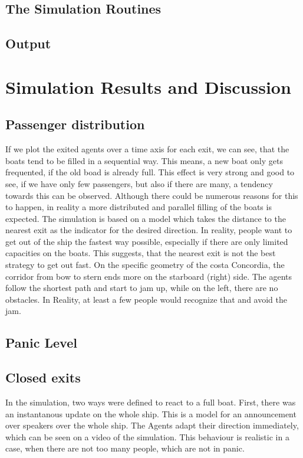 \documentclass[11pt]{article}
\begin{document}
\subsection{The Simulation Routines} %
\label{sub:The simulation Routines}


\subsection{Output} %
\label{sub:Output}

\section{Simulation Results and Discussion}

\subsection{Passenger distribution} %
If we plot the exited agents over a time axis for each exit, we can see, that the boats tend to be filled in a sequential way.
This means, a new boat only gets frequented, if the old boad is already full. This effect is very strong and good to see, if we have only few passengers, but also if there are many, a tendency towards this can be observed.
Although there could be numerous reasons for this to happen, in reality a more distributed and parallel filling of the boats is expected. The simulation is based on a model which takes the distance to the nearest exit as the indicator for the desired direction.
In reality, people want to get out of the ship the fastest way possible, especially if there are only limited capacities on the boats.
This suggests, that the nearest exit is not the best strategy to get out fast.
On the specific geometry of the costa Concordia, the corridor from bow to stern ends more on the starboard (right) side. 
The agents follow the shortest path and start to jam up, while on the left, there are no obstacles.
In Reality, at least a few people would recognize that and avoid the jam.

\subsection{Panic Level} %

\subsection{Closed exits} %
\label{sub:Closed exits}
In the simulation, two ways were defined to react to a full boat. First, there was an instantanous update on the whole ship.
This is a model for an announcement over speakers over the whole ship.
The Agents adapt their direction immediately, which can be seen on a video of the simulation.
This behaviour is realistic in a case, when there are not too many people, which are not in panic.
\end{document}
